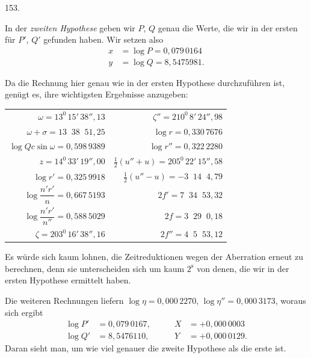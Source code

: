 \par{}\medskip
\hypertarget{native-207-article153}{}
\begin{center}153.\end{center}
In der \textit{zweiten Hypothese} geben wir $P$, $Q$ genau die Werte, die wir in der ersten für $P'$, $Q'$ gefunden haben. Wir setzen also
\[
\begin{aligned}
x&=\log P=0{,}079\,0164\\
y&=\log Q=8{,}5475981.
\end{aligned}
\]

Da die Rechnung hier genau wie in der ersten Hypothese durchzuführen ist, genügt es, ihre wichtigsten Ergebnisse anzugeben:
\begin{center}
\small
\setlength{\tabcolsep}{6pt}
\begin{tabular}{@{}r|r@{}}
$\omega=13^0\,15'\,38''{,}13$ & $\zeta''=210^0\,8'\,24''{,}98$\\[.5em]
$\omega+\sigma=13\;\;38\;\;51{,}25$ & $\log r=0{,}330\,7676$\\[.5em]
$\log Qc\sin\omega=0{,}598\,9389$ & $\log r''=0{,}322\,2280$\\[.5em]
$z=14^0\,33'\,19''{,}00$ & $\tfrac12(u''+u)=205^0\,22'\,15''{,}58$\\[.5em]
$\log r'=0{,}325\,9918$ & $\tfrac12(u''-u)=-3\;\;14\;\;4{,}79$\\[.7em]
$\log\dfrac{n'r'}{n}=0{,}667\,5193$ & $2f'=7\;\;34\;\;53{,}32$\\[.7em]
$\log\dfrac{n'r'}{n''}=0{,}588\,5029$ & $2f=3\;\;29\;\;0{,}18$\\[.5em]
$\zeta=203^0\,16'\,38''{,}16$ & $2f''=4\;\;5\;\;53{,}12$
\end{tabular}
\end{center}

Es würde sich kaum lohnen, die Zeitreduktionen wegen der Aberration erneut zu berechnen, denn sie unterscheiden sich um kaum $2^{\mathrm{s}}$ von denen, die wir in der ersten Hypothese ermittelt haben.

Die weiteren Rechnungen liefern $\log\eta=0{,}000\,2270$, $\log\eta''=0{,}000\,3173$, woraus sich ergibt
\[
\begin{aligned}
\log P'&=0{,}079\,0167,&\qquad X&=+0{,}000\,0003\\
\log Q'&=8{,}5476110,&\qquad Y&=+0{,}000\,0129.
\end{aligned}
\]
Daran sieht man, um wie viel genauer die zweite Hypothese als die erste ist.

